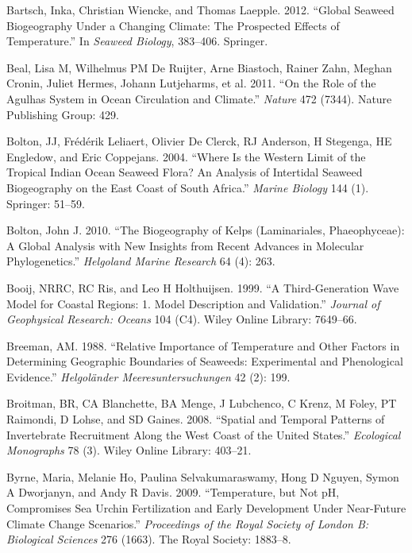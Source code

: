 \documentclass[12pt,A4paper,]{article}
\begin{document}
\hypertarget{refs}{}
\hypertarget{ref-Bartsch2012}{}
Bartsch, Inka, Christian Wiencke, and Thomas Laepple. 2012. ``Global
Seaweed Biogeography Under a Changing Climate: The Prospected Effects of
Temperature.'' In \emph{Seaweed Biology}, 383--406. Springer.

\hypertarget{ref-Beal2011}{}
Beal, Lisa M, Wilhelmus PM De Ruijter, Arne Biastoch, Rainer Zahn,
Meghan Cronin, Juliet Hermes, Johann Lutjeharms, et al. 2011. ``On the
Role of the Agulhas System in Ocean Circulation and Climate.''
\emph{Nature} 472 (7344). Nature Publishing Group: 429.

\hypertarget{ref-Bolton2004}{}
Bolton, JJ, Frédérik Leliaert, Olivier De Clerck, RJ Anderson, H
Stegenga, HE Engledow, and Eric Coppejans. 2004. ``Where Is the Western
Limit of the Tropical Indian Ocean Seaweed Flora? An Analysis of
Intertidal Seaweed Biogeography on the East Coast of South Africa.''
\emph{Marine Biology} 144 (1). Springer: 51--59.

\hypertarget{ref-Bolton2010}{}
Bolton, John J. 2010. ``The Biogeography of Kelps (Laminariales,
Phaeophyceae): A Global Analysis with New Insights from Recent Advances
in Molecular Phylogenetics.'' \emph{Helgoland Marine Research} 64 (4):
263.

\hypertarget{ref-Booij1999}{}
Booij, NRRC, RC Ris, and Leo H Holthuijsen. 1999. ``A Third-Generation
Wave Model for Coastal Regions: 1. Model Description and Validation.''
\emph{Journal of Geophysical Research: Oceans} 104 (C4). Wiley Online
Library: 7649--66.

\hypertarget{ref-Breeman1988}{}
Breeman, AM. 1988. ``Relative Importance of Temperature and Other
Factors in Determining Geographic Boundaries of Seaweeds: Experimental
and Phenological Evidence.'' \emph{Helgoländer Meeresuntersuchungen} 42
(2): 199.

\hypertarget{ref-Broitman2008}{}
Broitman, BR, CA Blanchette, BA Menge, J Lubchenco, C Krenz, M Foley, PT
Raimondi, D Lohse, and SD Gaines. 2008. ``Spatial and Temporal Patterns
of Invertebrate Recruitment Along the West Coast of the United States.''
\emph{Ecological Monographs} 78 (3). Wiley Online Library: 403--21.

\hypertarget{ref-Byrne2009}{}
Byrne, Maria, Melanie Ho, Paulina Selvakumaraswamy, Hong D Nguyen, Symon
A Dworjanyn, and Andy R Davis. 2009. ``Temperature, but Not pH,
Compromises Sea Urchin Fertilization and Early Development Under
Near-Future Climate Change Scenarios.'' \emph{Proceedings of the Royal
Society of London B: Biological Sciences} 276 (1663). The Royal Society:
1883--8.
\end{document}
